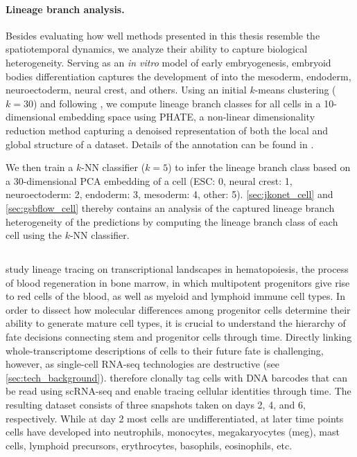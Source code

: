 \paragraph{Lineage branch analysis.}
Besides evaluating how well methods presented in this thesis resemble the spatiotemporal dynamics, we analyze their ability to capture biological heterogeneity.
Serving as an \emph{in vitro} model of early embryogenesis, embryoid bodies differentiation captures the development of  into the mesoderm, endoderm, neuroectoderm, neural crest, and others.
Using an initial $k$-means clustering ($k=30$) and following \citet[Fig. 6, Suppl. Note 4]{moon2019visualizing}, we compute lineage branch classes for all cells in a 10-dimensional embedding space using PHATE, a non-linear dimensionality reduction method capturing a denoised representation of both the local and global structure of a dataset.
Details of the annotation can be found in \citet{bunne2022proximal, bunne2022recovering}.

We then train a $k$-NN classifier ($k=5$) to infer the lineage branch class based on a 30-dimensional PCA embedding of a cell (ESC: 0, neural crest: 1, neuroectoderm: 2, endoderm: 3, mesoderm: 4, other: 5).
\cref{sec:jkonet_cell} and \ref{sec:gsbflow_cell} thereby contains an analysis of the captured lineage branch heterogeneity of the predictions by computing the lineage branch class of each cell using the $k$-NN classifier.

\subsection{\citet{weinreb2020lineage}}
\label{app:dataset_weinreb}

\citet{weinreb2020lineage} study lineage tracing on transcriptional landscapes in hematopoiesis, the process of blood regeneration in bone marrow, in which multipotent progenitors give rise to red cells of the blood, as well as myeloid and lymphoid immune cell types.
In order to dissect how molecular differences among progenitor cells determine their ability to generate mature cell types, it is crucial to understand the hierarchy of fate decisions connecting stem and progenitor cells through time.
Directly linking whole-transcriptome descriptions of cells to their future fate is challenging, however, as single-cell \acrshort{RNA-seq} technologies are destructive (see \cref{sec:tech_background}). 
\citet{weinreb2020lineage} therefore clonally tag cells with DNA barcodes that can be read using sc\acrshort{RNA-seq} and enable tracing cellular identities through time.
The resulting dataset consists of three snapshots taken on days 2, 4, and 6, respectively. While at day 2 most cells are undifferentiated, at later time points cells have developed into neutrophils, monocytes, megakaryocytes (meg), mast cells, lymphoid precursors, erythrocytes, basophils, eosinophils, etc.

